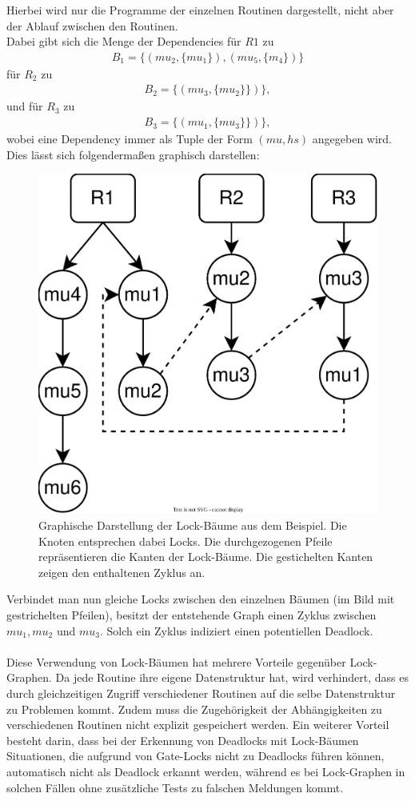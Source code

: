 Hierbei wird nur die Programme der einzelnen Routinen dargestellt, 
nicht aber der Ablauf zwischen den Routinen.\\
Dabei gibt sich die Menge der Dependencies für $R1$ zu 
\begin{align*}
    B_1 = \{(mu_2, \{mu_1\}), (mu_5, \{m_4\})\}
\end{align*}
für $R_2$ zu 
\begin{align*}
    B_2 = \{(mu_3, \{mu_2\}\})\},
\end{align*}
und für $R_3$ zu 
\begin{align*}
    B_3 = \{(mu_1, \{mu_3\}\})\},
\end{align*} wobei eine Dependency immer als Tuple der Form $(mu, hs)$ angegeben 
wird. Dies lässt sich folgendermaßen graphisch darstellen:
\begin{figure}[H]
    \centering
    \includegraphics[width=.47\textwidth]{img/tree_example.eps}
    \caption{Graphische Darstellung der Lock-Bäume aus dem Beispiel. Die Knoten 
    entsprechen dabei Locks. Die durchgezogenen Pfeile repräsentieren die Kanten 
    der Lock-Bäume. Die gestichelten Kanten zeigen den enthaltenen Zyklus an.}
\end{figure}
Verbindet man nun 
gleiche Locks zwischen den einzelnen Bäumen (im Bild mit gestrichelten Pfeilen),
besitzt der entstehende Graph einen Zyklus zwischen $mu_1, mu_2$ und $mu_3$. 
Solch ein Zyklus indiziert einen potentiellen Deadlock.\\\\
Diese Verwendung von Lock-Bäumen hat mehrere Vorteile gegenüber Lock-Graphen. 
Da jede Routine ihre 
eigene Datenstruktur hat, wird verhindert, dass es durch 
gleichzeitigen Zugriff verschiedener Routinen auf die selbe Datenstruktur zu 
Problemen kommt. Zudem muss die Zugehörigkeit der Abhängigkeiten zu 
verschiedenen Routinen nicht explizit gespeichert werden. Ein weiterer Vorteil 
besteht darin, dass bei der Erkennung von Deadlocks mit Lock-Bäumen Situationen,
die aufgrund von Gate-Locks nicht zu Deadlocks führen können, automatisch nicht
als Deadlock erkannt werden, während es bei Lock-Graphen in solchen Fällen ohne 
zusätzliche Tests zu falschen Meldungen kommt.  

